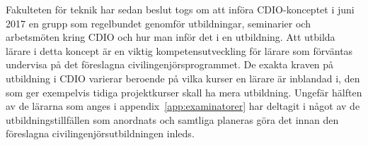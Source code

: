 Fakulteten för teknik har sedan beslut togs om att införa CDIO-konceptet i juni 2017 en grupp som regelbundet genomför utbildningar, seminarier och arbetsmöten kring CDIO och hur man inför det i en utbildning. Att utbilda lärare i detta koncept är en viktig kompetensutveckling för lärare som förväntas undervisa på det föreslagna civilingenjörsprogrammet. De exakta kraven på utbildning i CDIO varierar beroende på vilka kurser en lärare är inblandad i, den som ger exempelvis tidiga projektkurser skall ha mera utbildning. Ungefär hälften av de lärarna som anges i appendix~\ref{app:examinatorer} har deltagit i något av de utbildningstillfällen som anordnats och samtliga planeras göra det innan den föreslagna civilingenjörsutbildningen inleds.